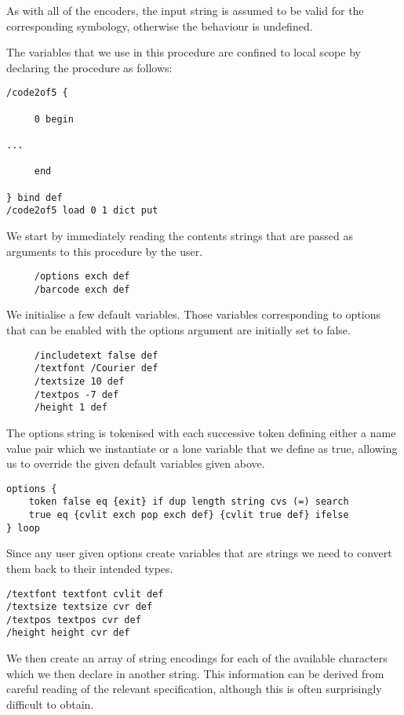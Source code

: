 \documentclass[11pt,english,BCOR10mm,DIV12,bibliography=totoc,parskip=false,smallheadings
    headexclude,footexclude,oneside]{pst-doc}
\begin{document}
As with all of the encoders, the input string is assumed to be valid for
the corresponding symbology, otherwise the behaviour is undefined.

The variables that we use in this procedure are confined to local
scope by declaring the procedure as follows:

\begin{lstlisting}
/code2of5 {
 
     0 begin

...

     end

} bind def
/code2of5 load 0 1 dict put
\end{lstlisting}

We start by immediately reading the contents strings that are passed as
arguments to this procedure by the user.

\begin{lstlisting}
     /options exch def
     /barcode exch def
\end{lstlisting}

We initialise a few default variables. Those variables corresponding to 
options that can be enabled with the options argument are initially
set to false.

\begin{lstlisting}
     /includetext false def 
     /textfont /Courier def
     /textsize 10 def
     /textpos -7 def
     /height 1 def
\end{lstlisting}

The options string is tokenised with each successive token defining either a
name value pair which we instantiate or a lone variable that we define as true, 
allowing us to override the given default variables given above.

\begin{lstlisting}
options {
    token false eq {exit} if dup length string cvs (=) search
    true eq {cvlit exch pop exch def} {cvlit true def} ifelse
} loop
\end{lstlisting}      

Since any user given options create variables that are strings we need to convert
them back to their intended types.

\begin{lstlisting}
/textfont textfont cvlit def
/textsize textsize cvr def
/textpos textpos cvr def
/height height cvr def	     
\end{lstlisting}

We then create an array of string encodings for each of the available
characters which we then declare in another string. This information
can be derived from careful reading of the relevant specification, 
although this is often surprisingly difficult to obtain. 
\end{document}
